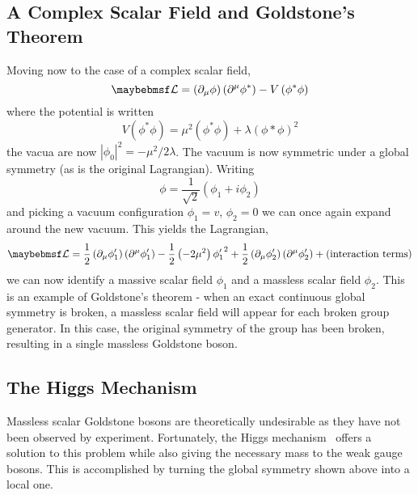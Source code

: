 \subsection{A Complex Scalar Field and Goldstone's Theorem}
\label{sec:sm_goldstone}
Moving now to the case of a complex scalar field,
\begin{equation}
\lagrangiand = \left(\partial_{\mu}\phi\right)\left(\partial^{\mu}\phi^*\right)
- V\left(\phi^*\phi\right)
\end{equation}
where the potential is written
\begin{equation}
V\left(\phi^*\phi\right) = \mu^2\left(\phi^*\phi\right) +
\lambda\left(\phi*\phi\right)^2
\end{equation}
the vacua are now $\left|\phi_0\right|^2 = -\mu^2/2\lambda$. The vacuum is now
symmetric under a global \Uone symmetry (as is the original Lagrangian). Writing
\begin{equation}
\phi = \frac{1}{\sqrt{2}}\left(\phi_1 + i\phi_2\right)
\end{equation}
and picking a vacuum configuration $\phi_1 = v$, $\phi_2 = 0$ we can once again
expand around the new vacuum. This yields the Lagrangian,
\begin{equation}
  \lagrangiand =
  \frac{1}{2}\left(\partial_{\mu}\phi'_1\right)\left(\partial^{\mu}\phi'_1\right)
  -\frac{1}{2}\left(-2\mu^2\right){\phi'_1}^2 +
  \frac{1}{2}\left(\partial_{\mu}\phi'_2\right)\left(\partial^{\mu}\phi'_2\right)
  + \textrm{(interaction terms)}
\end{equation}
we can now identify a massive scalar field $\phi_1$ and a massless scalar field
$\phi_2$. This is an example of Goldstone's theorem - when an exact continuous
global symmetry is broken, a massless scalar field will appear for each broken
group generator. In this case, the original \Uone symmetry of the group has been
broken, resulting in a single massless Goldstone boson.

\subsection{The Higgs Mechanism}
\label{sec:sm_higgs}
Massless scalar Goldstone bosons are theoretically undesirable as they have not
been observed by experiment. Fortunately, the Higgs mechanism~\cite{higgs} offers
a solution to this problem while also giving the necessary mass to the weak
gauge bosons. This is accomplished by turning the global symmetry shown above
into a local one.

